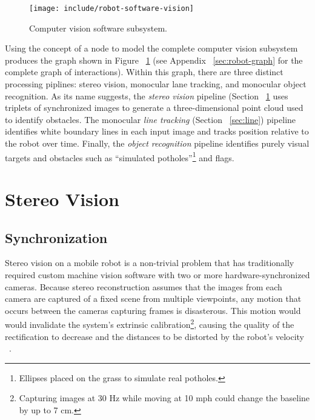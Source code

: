 \documentclass[11pt,twocolumn]{article}
\begin{document}
\begin{figure}
	\centering
	\texttt{[image: include/robot-software-vision]}
	\caption{Computer vision software subsystem.}
	\label{fig:robot-vision}
\end{figure}

Using the concept of a node to model the complete computer vision subsystem
produces the graph shown in Figure ~\ref{fig:robot-vision} (see Appendix
~\ref{sec:robot-graph} for the complete graph of interactions). Within this
graph, there are three distinct processing piplines: stereo vision, monocular
lane tracking, and monocular object recognition. As its name suggests, the
\textit{stereo vision} pipeline (Section ~\ref{sec:stereo} uses triplets of
synchronized images to generate a three-dimensional point cloud used to
identify obstacles. The monocular \textit{line tracking} (Section
~\ref{sec:line}) pipeline identifies white boundary lines in each input image
and tracks position relative to the robot over time. Finally, the
\textit{object recognition} pipeline identifies purely visual targets and
obstacles such as ``simulated potholes''\footnote{Ellipses placed on the grass
to simulate real potholes.} and flags.


\section{Stereo Vision}
\label{sec:stereo}

\subsection{Synchronization}
\label{sec:stereo-sync}
Stereo vision on a mobile robot is a non-trivial problem that has traditionally
required custom machine vision software with two or more hardware-synchronized
cameras. Because stereo reconstruction assumes that the images from each camera
are captured of a fixed scene from multiple viewpoints, any motion that occurs
between the cameras capturing frames is disasterous. This motion would would
invalidate the system's extrinsic calibration\footnote{Capturing images at 30
Hz while moving at 10 mph could change the baseline by up to 7 cm.}, causing
the quality of the rectification to decrease and the distances to be distorted
by the robot's velocity ~\cite{unsync}.
\end{document}
